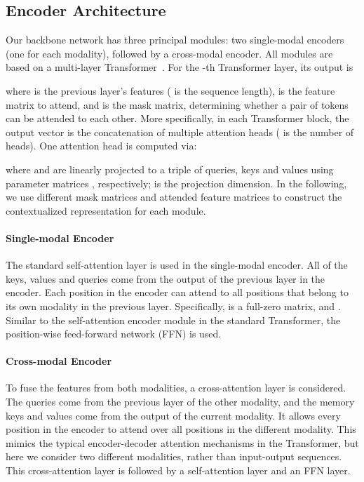 \documentclass[10pt,twocolumn,letterpaper]{article}
\begin{document}
\subsection{Encoder Architecture}

Our backbone network has three principal modules: two single-modal encoders (one for each modality), followed by a cross-modal encoder. All modules are based on a multi-layer Transformer~\cite{vaswani2017attention}. For the -th Transformer layer, its output is

where  is the previous layer's features ( is the sequence length),  is the feature matrix to attend, and  is the mask matrix, determining whether a pair of tokens can be attended to each other.
More specifically, in each Transformer block, the output vector is the concatenation of multiple attention heads  ( is the number of heads). One attention head  is computed via:

where   and  are linearly projected to a triple of queries, keys and values using parameter matrices , respectively;  is the projection dimension.
In the following, we use different mask matrices  and attended feature matrices  to construct the contextualized representation for each module.

\paragraph{Single-modal Encoder} The standard self-attention layer is used in the single-modal encoder. All of the keys, values and queries come from the output of the previous layer in the encoder. Each position in the encoder can attend to all positions that belong to its own modality in the previous layer.
Specifically,  is a full-zero matrix, and . Similar to the self-attention encoder module in the standard Transformer, the position-wise feed-forward network (FFN) is used.


\paragraph{Cross-modal Encoder} To fuse the features from both modalities, a cross-attention layer is considered. The queries  come from the previous layer of the other modality, and the memory keys and values come from the output  of the current modality. It allows every position in the encoder to attend over all positions in the different modality. This mimics the typical encoder-decoder attention mechanisms in the Transformer, but here we consider two different modalities, rather than input-output sequences. This cross-attention layer is followed by a self-attention layer and an FFN layer. 
\end{document}
